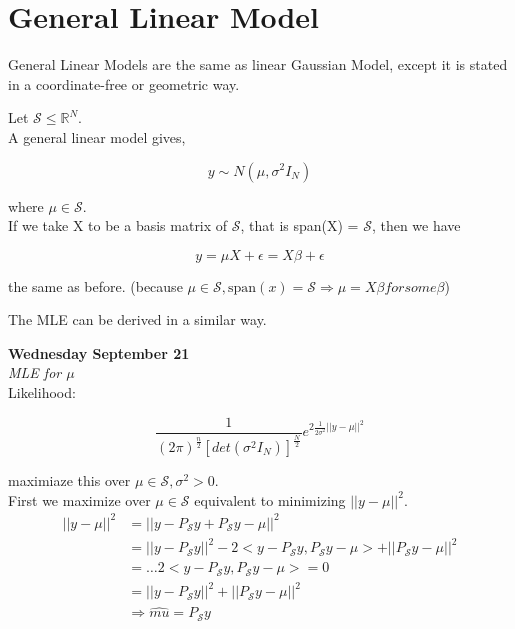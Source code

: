 \documentclass[11pt,fleqn]{book} %
\begin{document}
 \section{General Linear Model}

\begin{definition}
	General Linear Models are the same as linear Gaussian Model, except it is stated in a coordinate-free or geometric way. 
\end{definition}

Let $\mathcal{S} \leq \mathbb{R}^N$.\\

A general linear model gives,

$$y \sim N(\mu, \sigma^2 I_N) $$

where $\mu \in \mathcal{S}$. \\

If we take X to be a basis matrix of $\mathcal{S}$, that is span(X) = $\mathcal{S}$, then we have 

$$y = \mu X + \epsilon = X\beta + \epsilon $$

the same as before. (because $\mu \in \mathcal{S}, \text{span}(x) = \mathcal{S} \Rightarrow \mu = X\beta for some \beta$)

The MLE can be derived in a similar way. 

\textbf{Wednesday September 21}\\

\textit{MLE for $\mu$}\\

Likelihood:

	$$\frac{1}{(2\pi)^{\frac{n}{2}}[det(\sigma^2 I_N)]^{\frac{N}{2}}} e^{2 \frac{1}{2\sigma^2}||y - \mu||^2} $$ 

	maximiaze this over $\mu \in \mathcal{S}, \sigma^2 > 0$.\\

	First we maximize over $\mu \in \mathcal{S}$ equivalent to minimizing $||y - \mu||^2$.\\

	\begin{align*}
		||y - \mu||^2 &= ||y - P_\mathcal{S}y + P_\mathcal{S}y - \mu||^2\\
			&= ||y - P_\mathcal{S}y||^2 - 2<y - P_\mathcal{S}y, P_\mathcal{S}y - \mu> + ||P_\mathcal{S}y - \mu ||^2\\
			&= \dots 2<y - P_\mathcal{S}y, P_\mathcal{S}y - \mu> = 0\\
			&= ||y - P_\mathcal{S}y||^2 + ||P_\mathcal{S}y - \mu ||^2\\
			&\Rightarrow \hat{mu} = P_\mathcal{S}y
	\end{align*}
\end{document}
